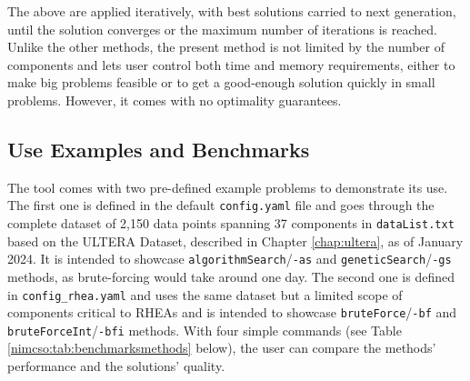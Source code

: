 The above are applied iteratively, with best solutions carried to next
generation, until the solution converges or the maximum number of
iterations is reached. Unlike the other methods, the present method is
not limited by the number of components and lets user control both time
and memory requirements, either to make big problems feasible or to get
a good-enough solution quickly in small problems. However, it comes with
no optimality guarantees.


\subsection{Use Examples and Benchmarks}

The tool comes with two pre-defined example problems to demonstrate its
use. The first one is defined in the default \texttt{config.yaml} file
and goes through the complete dataset of 2,150 data points spanning 37
components in \texttt{dataList.txt} based on the ULTERA Dataset, described in Chapter \ref{chap:ultera}, as of January 2024. It is
intended to showcase \texttt{algorithmSearch}/\texttt{-as} and
\texttt{geneticSearch}/\texttt{-gs} methods, as brute-forcing would take
around one day. The second one is defined in \texttt{config\_rhea.yaml}
and uses the same dataset but a limited scope of components critical to
RHEAs \cite{Senkov2018} and is
intended to showcase \texttt{bruteForce}/\texttt{-bf} and
\texttt{bruteForceInt}/\texttt{-bfi} methods. With four simple commands
(see Table \ref{nimcso:tab:benchmarksmethods} below), the user can compare the methods' performance and the solutions' quality.


